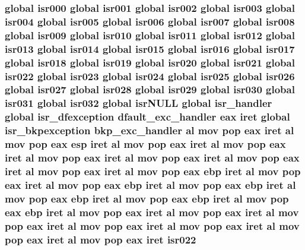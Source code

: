 \subsubsection[{\texorpdfstring{isr022}{isr022}}]{\setlength{\rightskip}{0pt plus 5cm}global {\bf isr000} global {\bf isr001} global {\bf isr002} global {\bf isr003} global {\bf isr004} global {\bf isr005} global {\bf isr006} global {\bf isr007} global {\bf isr008} global {\bf isr009} global {\bf isr010} global {\bf isr011} global {\bf isr012} global {\bf isr013} global {\bf isr014} global {\bf isr015} global {\bf isr016} global {\bf isr017} global {\bf isr018} global {\bf isr019} global {\bf isr020} global {\bf isr021} global isr022 global {\bf isr023} global {\bf isr024} global {\bf isr025} global {\bf isr026} global {\bf isr027} global {\bf isr028} global {\bf isr029} global {\bf isr030} global {\bf isr031} global isr032 global isr\+N\+U\+LL global isr\+\_\+handler global {\bf isr\+\_\+dfexception} {\bf dfault\+\_\+exc\+\_\+handler} eax iret global {\bf isr\+\_\+bkpexception} {\bf bkp\+\_\+exc\+\_\+handler} {\bf al} {\bf mov} pop eax iret {\bf al} {\bf mov} pop eax esp iret {\bf al} {\bf mov} pop eax iret {\bf al} {\bf mov} pop eax iret {\bf al} {\bf mov} pop eax iret {\bf al} {\bf mov} pop eax iret {\bf al} {\bf mov} pop eax iret {\bf al} {\bf mov} pop eax iret {\bf al} {\bf mov} pop eax ebp iret {\bf al} {\bf mov} pop eax iret {\bf al} {\bf mov} pop eax ebp iret {\bf al} {\bf mov} pop eax ebp iret {\bf al} {\bf mov} pop eax ebp iret {\bf al} {\bf mov} pop eax ebp iret {\bf al} {\bf mov} pop eax ebp iret {\bf al} {\bf mov} pop eax iret {\bf al} {\bf mov} pop eax iret {\bf al} {\bf mov} pop eax iret {\bf al} {\bf mov} pop eax iret {\bf al} {\bf mov} pop eax iret {\bf al} {\bf mov} pop eax iret {\bf al} {\bf mov} pop eax iret isr022}\hypertarget{isrs_8as_aad0ed25c86326ecf71279d9e4e4a3c26}{}\label{isrs_8as_aad0ed25c86326ecf71279d9e4e4a3c26}
